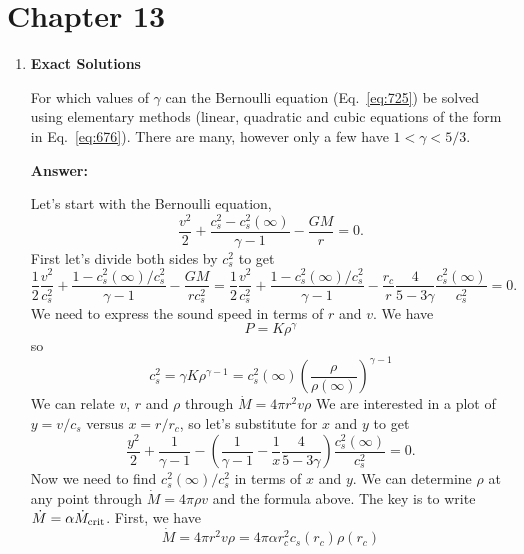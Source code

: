 \documentclass{article}
\newcommand{\rmscr}[1]{{\hbox{\rm \scriptsize #1}}}
\begin{document}
\fi

\section{Chapter 13}
\begin{enumerate}
\item{\bf Exact Solutions}

For which values of $\gamma$ can the Bernoulli equation
(Eq.~\ref{eq:725}) be solved using elementary methods (linear,
quadratic and cubic equations of the form in Eq.~\ref{eq:676}).  There
are many, however only a few have $1< \gamma < 5/3$.

{\bf Answer: }

Let's start with the Bernoulli equation,
\begin{equation}
\frac{v^2}{2} + \frac{c_s^2 - c_s^2(\infty)}{\gamma - 1} - \frac{G M}{r} = 0.
\end{equation}
First let's divide both sides by $c_s^2$ to get
\begin{equation}
\frac{1}{2} \frac{v^2}{c_s^2} + \frac{1 - c_s^2(\infty)/c_s^2}{\gamma -
  1} - \frac{G M}{r c_s^2} =
\frac{1}{2} \frac{v^2}{c_s^2} + \frac{1 - c_s^2(\infty)/c_s^2}{\gamma -
  1} - \frac{r_c}{r} \frac{4}{5-3\gamma} \frac{c_s^2(\infty)}{c_s^2} = 0.
\end{equation}
We need to express the sound speed in terms of $r$ and $v$.  We have
\begin{equation}
P = K \rho^\gamma
\end{equation}
so
\begin{equation}
c_s^2 = \gamma K \rho^{\gamma-1} = c_s^2(\infty) \left ( \frac
{\rho}{\rho(\infty)} \right )^{\gamma - 1}
\end{equation}
We can relate $v$, $r$ and $\rho$ through ${\dot M}=4\pi r^2 v \rho$
We are interested in a plot of $y=v/c_s$ versus $x=r/r_c$, so let's
substitute for $x$ and $y$ to get
\begin{equation}
\frac{y^2}{2} + \frac{1}{\gamma-1} - \left ( \frac{1}{\gamma-1}  - \frac{1}{x}
\frac{4}{5-3\gamma} \right ) \frac{c_s^2(\infty)}{c_s^2} = 0.
\end{equation}
Now we need to find $c_s^2(\infty)/c_s^2$ in terms of $x$ and $y$.  We
can determine $\rho$ at any point through ${\dot M}=4\pi \rho v$ and 
the formula above.  
The key is to write ${\dot M}=\alpha {\dot M}_\rmscr{crit}$.  First,
we have
\begin{equation}
\dot M = 4 \pi r^2 v \rho = 4 \pi \alpha r_c^2 c_s(r_c) \rho(r_c)
\end{equation}

\end{enumerate}
\end{document}
